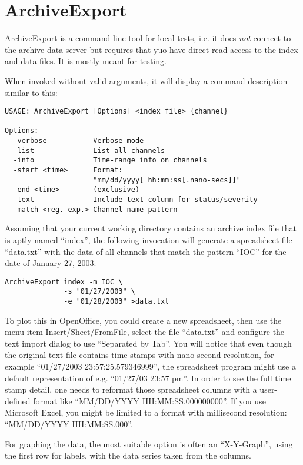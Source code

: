 \chapter{ArchiveExport}

ArchiveExport is a command-line tool for local tests, i.e. it does
\emph{not} connect to the archive data server but requires that
yuo have direct read access to the index and data files.
It is mostly meant for testing.

When invoked without valid arguments, it will display a command
description similar to this:

\begin{lstlisting}[frame=none,keywordstyle=\sffamily]
USAGE: ArchiveExport [Options] <index file> {channel}

Options:
  -verbose           Verbose mode
  -list              List all channels
  -info              Time-range info on channels
  -start <time>      Format:
                     "mm/dd/yyyy[ hh:mm:ss[.nano-secs]]"
  -end <time>        (exclusive)
  -text              Include text column for status/severity
  -match <reg. exp.> Channel name pattern   
\end{lstlisting}

\noindent Assuming that your current working directory contains an
archive index file that is aptly named ``index'', the following
invocation will generate a spreadsheet file ``data.txt'' with the data
of all channels that match the pattern ``IOC'' for the date of January
27, 2003:

\begin{lstlisting}[frame=none,keywordstyle=\sffamily]
ArchiveExport index -m IOC \
              -s "01/27/2003" \
              -e "01/28/2003" >data.txt
\end{lstlisting}

\noindent To plot this in OpenOffice, you could create a new
spreadsheet, then use the menu item Insert/Sheet/FromFile, select the
file ``data.txt'' and configure the text import dialog to use
``Separated by Tab''. You will notice that even though the original
text file contains time stamps with nano-second resolution, for
example ``01/27/2003 23:57:25.579346999'', the spreadsheet program
might use a default representation of e.g. 
``01/27/03 23:57 pm''.
In order to see the full time stamp detail, one needs to reformat
those spreadsheet columns with a user-defined format like
``MM/DD/YYYY HH:MM:SS.000000000''.
If you use Microsoft Excel, you might be limited to a format with
millisecond resolution: ``MM/DD/YYYY HH:MM:SS.000''.

For graphing the data, the most suitable option is often an
``X-Y-Graph'', using the first row for labels, with the data series
taken from the columns.
